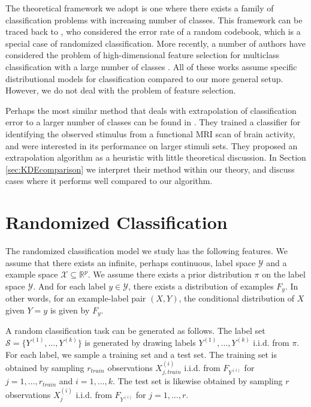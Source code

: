 \documentclass[twoside,11pt]{article}
\begin{document}
The theoretical framework we adopt is one where there exists a family
of classification problems with increasing number of classes. This
framework can be traced back to \cite{Shannon1948}, who considered the error rate of a random codebook, which is a special case of randomized classification. More recently, a number of authors have considered the problem of high-dimensional feature selection for multiclass
classification with a large number of classes \citep{pan2016ultrahigh,
  abramovich2015feature, davis2011bayesian}.  All of these works
assume specific distributional models for classification compared to
our more general setup. However, we do not deal with the problem of
feature selection.

Perhaps the most similar method that deals with extrapolation of classification error to a larger number of classes can be found in \cite{Kay2008a}. They trained a classifier for identifying the observed stimulus from a functional MRI scan of brain activity, and were interested in its performance on larger stimuli sets. They proposed an extrapolation algorithm as a heuristic with little theoretical discussion. In Section \ref{sec:KDEcomparison} we interpret their method within our theory, and discuss cases where it performs well compared to our algorithm.



\section{Randomized Classification}\label{sec:rc_motivation}

The randomized classification model we study has the following
features.  We assume that there exists an infinite, perhaps
continuous, label space $\mathcal{Y}$ and a example space $\mathcal{X}
\subseteq \mathbb{R}^p$.  We assume there exists a prior distribution $\pi$
on the label space $\mathcal{Y}$.  And for each label $y \in
\mathcal{Y}$, there exists a distribution of examples $F_y$. In other
words, for an example-label pair $(X, Y)$, the conditional
distribution of $X$ given $Y = y$ is given by $F_y$.

A random classification task can be generated as follows.  The label
set $\mathcal{S} = \{Y^{(1)},\hdots, Y^{(k)}\}$ is generated by
drawing labels $Y^{(1)},\hdots, Y^{(k)}$ i.i.d. from $\pi$.  For each
label, we sample a training set and a test set.  The training set is
obtained by sampling $r_{train}$ observations $X_{j, train}^{(i)}$
i.i.d. from $F_{Y^{(i)}}$ for $j = 1,\hdots, r_{train}$ and $i =
1,\hdots, k$.  The test set is likewise obtained by sampling $r$
observations $X_j^{(i)}$ i.i.d. from $F_{Y^{(i)}}$ for $j = 1,\hdots,
r$.
\end{document}
